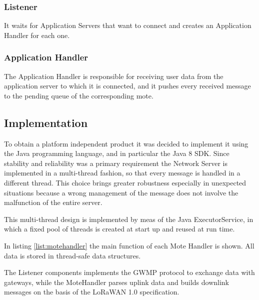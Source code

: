\subsubsection{Listener}
It waits for Application Servers that want to connect and creates an Application Handler for each one.

\subsubsection{Application Handler}
The Application Handler is responsible for receiving user data from the application server to which it is connected, and it pushes every received message to the pending queue of the corresponding mote.

\subsection{Implementation}
To obtain a platform independent product it was decided to implement it using the Java programming language, and in particular the Java 8 SDK. Since stability and reliability was a primary requirement the Network Server is implemented in a multi-thread fashion, so that every message is handled in a different thread. This choice brings greater robustness especially in unexpected situations because a wrong management of the message does not involve the malfunction of the entire server.

This multi-thread design is implemented by meas of the Java ExecutorService, in which a fixed pool of threads is created at start up and reused at run time.

In listing \ref{list:motehandler} the main function of each Mote Handler is shown. All data is stored in thread-safe data structures.

The Listener components implements the GWMP protocol to exchange data with gateways, while the MoteHandler parses uplink data and builds downlink messages on the basis of the LoRaWAN 1.0 specification.\cite{lorawanspec}


